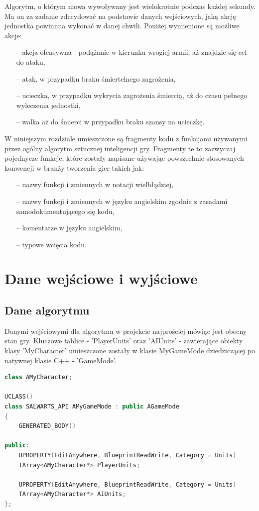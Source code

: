 \documentclass[12pt]{report}
\begin{document}
Algorytm, o którym mowa wywoływany jest wielokrotnie podczas każdej sekundy. Ma on za zadanie zdecydować na podstawie danych wejściowych, jaką akcję jednostka powinnna wykonać w danej chwili. Poniżej wymienione są możliwe akcje:
\begin{itemize}
\item[--] akcja ofensywna - podążanie w kierunku wrogiej armii, aż znajdzie się cel do ataku,
\item[--] atak, w przypadku braku śmiertelnego zagrożenia,
\item[--] ucieczka, w przypadku wykrycia zagrożenia śmiercią, aż do czasu pełnego wyleczenia jednostki,
\item[--] walka aż do śmierci w przypadku braku szansy na ucieczkę.
\end{itemize}

W niniejszym rozdziale umieszczone są fragmenty kodu z funkcjami używanymi przez ogólny algorytm sztucznej inteligencji gry. Fragmenty te to zazwyczaj pojednycze funkcje, które zostały napisane używając powszechnie stosowanych konwencji w branży tworzenia gier takich jak:
\begin{itemize}
\item[--] nazwy funkcji i zmiennych w notacji wielbłądziej,
\item[--] nazwy funkcji i zmiennych w języku angielskim zgodnie z zasadami samodokumentującego się kodu,
\item[--] komentarze w języku angielskim,
\item[--] typowe wcięcia kodu.
\end{itemize}

\section{Dane wejściowe i wyjściowe}
\subsection{Dane algorytmu}
Danymi wejściowymi dla algorytmu w projekcie najprościej mówiąc jest obecny stan gry. Kluczowe tablice - 'PlayerUnits' oraz 'AIUnits' - zawierające obiekty klasy 'MyCharacter' umieszczone zostały w klasie MyGameMode dziedziczącej po natywnej klasie C++ - 'GameMode'. 

\begin{lstlisting}[language=C++, backgroundcolor=\color{black!5}, basicstyle=\footnotesize, caption=Klasa AMyGameMode.h.]
   class AMyCharacter;

UCLASS()
class SALWARTS_API AMyGameMode : public AGameMode
{
	GENERATED_BODY()

public:
	UPROPERTY(EditAnywhere, BlueprintReadWrite, Category = Units)
	TArray<AMyCharacter*> PlayerUnits;

	UPROPERTY(EditAnywhere, BlueprintReadWrite, Category = Units)
	TArray<AMyCharacter*> AiUnits;
};
\end{lstlisting}
\end{document}
